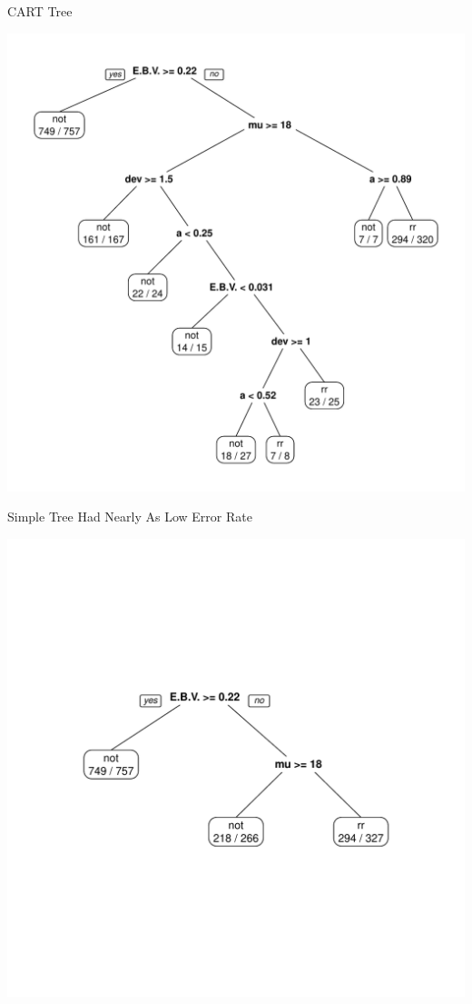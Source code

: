 \documentclass[12pt]{beamer}
\begin{document}
\begin{frame}{CART Tree}
  \begin{center}
    \includegraphics[scale=0.4]{figs/rpart_fulltree.pdf}
    \end{center}
\end{frame}

\begin{frame}{Simple Tree Had Nearly As Low Error Rate}
  \begin{center}
    \includegraphics[scale=0.4]{figs/rpart_pruned.pdf}
    \end{center}
\end{frame}
\end{document}
